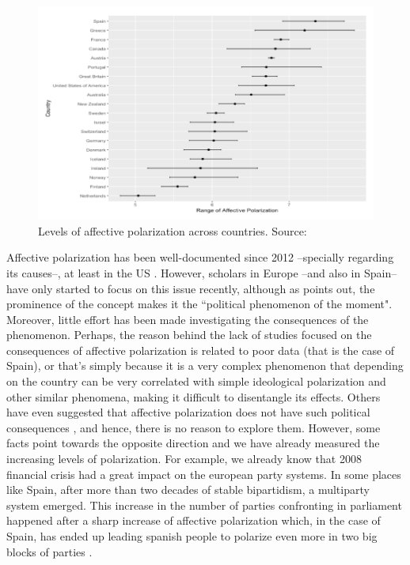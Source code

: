\documentclass[a4paper, svgnames]{article}
\begin{document}
\begin{figure}
	\centering
	\includegraphics[scale=.7]{figure1.png}
	\caption{\label{fig:af-pol-comp} Levels of affective polarization across countries. Source: \cite{Gidron2018}}
\end{figure}

Affective polarization has been well-documented since 2012 --specially regarding its causes--, at least in the US \citep{Hetherington2015,Rogowski2016a, Webster2017,Lelkes2018,Iyengar2019, Klein2020}. However, scholars in Europe --and also in Spain-- have only started to focus on this issue recently, although as \cite{Miller2019} points out, the prominence of the concept makes it the ``political phenomenon of the moment". Moreover, little effort has been made investigating the consequences of the phenomenon. Perhaps, the reason behind the lack of studies focused on the consequences of affective polarization is related to poor data (that is the case of Spain), or that's simply because it is a very complex phenomenon that depending on the country can be very correlated with simple ideological polarization and other similar phenomena, making it difficult to disentangle its effects. Others have even suggested that affective polarization does not have such political consequences \citep*{broockmanDoesAffectivePolarization2020}, and hence, there is no reason to explore them. However, some facts point towards the opposite direction and we have already measured the increasing levels of polarization. For example, we already know that 2008 financial crisis had a great impact on the european party systems. In some places like Spain, after more than two decades of stable bipartidism, a multiparty system emerged. This increase in the number of parties confronting in parliament happened after a sharp increase of affective polarization which, in the case of Spain, has ended up leading spanish people to polarize even more in two big blocks of parties \citep{Orriols2020}.
\end{document}
